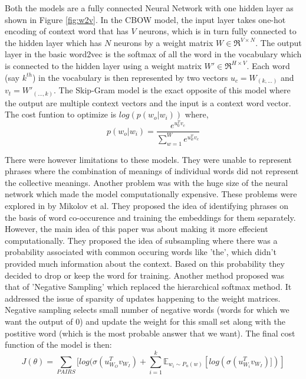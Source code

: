\documentclass{article}
\begin{document}
	Both the models are a fully connected Neural Network with one hidden layer as shown in Figure \ref{fig:w2v}. In the CBOW model, the input layer takes one-hot encoding of context word that has \(V\) neurons, which is in turn fully connected to the hidden layer which has \(N\) neurons by a weight matrix \(W \in \Re^{V \times N}\). The output layer in the basic word2vec is the softmax of all the word in the vocabulary which is connected to the hidden layer using a weight matrix \(W' \in \Re^{H \times V}\). Each word (say \(k^{th}\)) in the vocabulary is then represented by two vectors \(u_c = W_{(k,...)}\) and \(v_t = W'_{(...,k)}\). The Skip-Gram model is the exact opposite of this model where the output are multiple context vectors and the input is a context word vector. The cost funtion to optimize is \(log( p(w_{o} | w_i))\) where,
	\[p(w_{o} | w_i) = \frac{e^{u_0^Tv_c}}{\sum_{w=1}^{W} e^{u_w^Tv_c}}\]
	
	There were however limitations to these models. They were unable to represent phrases where the combination of meanings of individual words did not represent the collective meanings. Another problem was with the huge size of the neural network which made the model computationally expensive. These problems were explored in \cite{mikngs} by Mikolov et al. They proposed the idea of identifying phrases on the basis of word co-occurence and training the embeddings for them separately. However, the main idea of this paper was about making it more effecient computationally. They proposed the idea of subsampling where there was a probability associated with common occuring words like 'the', which didn't provided much information about the context. Based on this probability they decided to drop or keep the word for training. Another method proposed was that of 'Negative Sampling' which replaced the hierarchical
	softmax method. It addressed the issue of sparsity of updates happening to the weight matrices. Negative sampling selects small number of negative words (words for which we want the output of 0) and update the weight for this small set along with the postitive word (which is the most probable answer that we want). The final cost function of the model is then: 
	\[J(\theta) = \sum_{PAIRS} [log(\sigma(u_{W_O}^Tv_{W_I}) + \sum_{i=1}^{k} \mathbb{E}_{w_i \sim P_n(w)} [log(\sigma(u_{W_i}^Tv_{W_I})])] \] 
\end{document}

